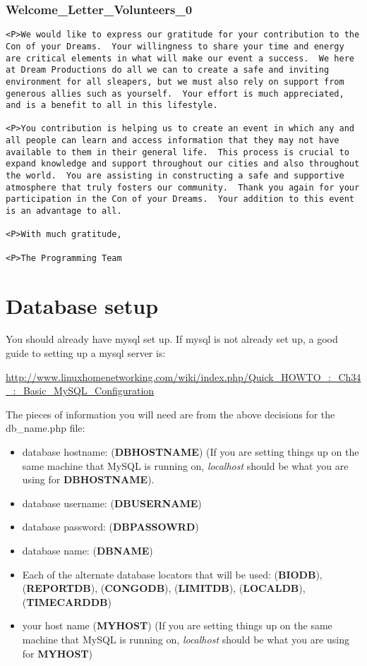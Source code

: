 \documentclass[captions=tablesignature]{scrartcl}
\begin{document}
\subsubsection{Welcome\_Letter\_Volunteers\_0}
\label{sec-3-5-8}
\begin{verbatim}
<P>We would like to express our gratitude for your contribution to the
Con of your Dreams.  Your willingness to share your time and energy
are critical elements in what will make our event a success.  We here
at Dream Productions do all we can to create a safe and inviting
environment for all sleapers, but we must also rely on support from
generous allies such as yourself.  Your effort is much appreciated,
and is a benefit to all in this lifestyle.

<P>You contribution is helping us to create an event in which any and
all people can learn and access information that they may not have
available to them in their general life.  This process is crucial to
expand knowledge and support throughout our cities and also throughout
the world.  You are assisting in constructing a safe and supportive
atmosphere that truly fosters our community.  Thank you again for your
participation in the Con of your Dreams.  Your addition to this event
is an advantage to all.

<P>With much gratitude,

<P>The Programming Team
\end{verbatim}

\section{Database setup}
\label{sec-4}
You should already have mysql set up.  If mysql is not already set
up, a good guide to setting up a mysql server is:

\begin{small}
\url{http://www.linuxhomenetworking.com/wiki/index.php/Quick_HOWTO_:_Ch34_:_Basic_MySQL_Configuration}
\end{small}

The pieces of information you will need are from the above decisions
for the db\_name.php file:

\begin{itemize}
\item database hostname: (\textbf{DBHOSTNAME}) (If you are setting things up on
the same machine that MySQL is running on, \emph{localhost} should be
what you are using for \textbf{DBHOSTNAME}).
\item database username: (\textbf{DBUSERNAME})
\item database password: (\textbf{DBPASSOWRD})
\item database name: (\textbf{DBNAME})
\item Each of the alternate database locators that will be used:
(\textbf{BIODB}), (\textbf{REPORTDB}), (\textbf{CONGODB}), (\textbf{LIMITDB}), (\textbf{LOCALDB}),
(\textbf{TIMECARDDB})
\item your host name (\textbf{MYHOST}) (If you are setting things up on the
same machine that MySQL is running on, \emph{localhost} should be what
you are using for \textbf{MYHOST})
\end{itemize}
\end{document}
